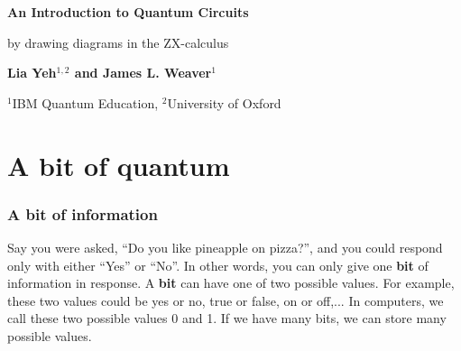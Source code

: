 \documentclass{article}
\theoremstyle{definition}
\begin{document}
\begin{titlepage}
	\begin{center}
		\vspace*{1cm}
 
		\textbf{An Introduction to Quantum Circuits}
 
		\vspace{0.5cm}
		by drawing diagrams in the ZX-calculus
			 
		\vspace{1.5cm}
 
		\textbf{Lia Yeh$^{1,2}$ and James L. Weaver$^1$}
 
		\vfill
			 
		$^1$IBM Quantum Education, $^2$University of Oxford
			 
		\vspace{0.8cm}
	  
						 
	\end{center}
 \end{titlepage}
 
\tableofcontents

\newpage




\section{A bit of quantum}
\subsubsection{A \textbf{bit} of information}
Say you were asked, ``Do you like pineapple on pizza?'', and you could respond only with either ``Yes'' or ``No''.
In other words, you can only give one \textbf{bit} of information in response.
A \textbf{bit} can have one of two possible values.  For example, these two values could be yes or no, true or false, on or off,...
In computers, we call these two possible values 0 and 1.  If we have many bits, we can store many possible values.
\end{document}

